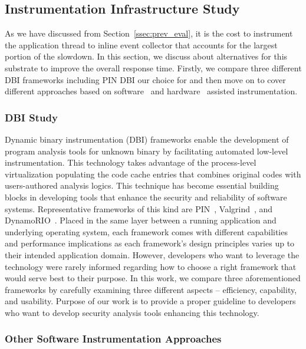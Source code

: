 \subsection{Instrumentation Infrastructure Study}
\label{ssec:inst_infra}

As we have discussed from Section~\ref{ssec:prev_eval}, it is the cost to
instrument the application thread to inline event collector that accounts for
the largest portion of the slowdown. In this section, we discuss about
alternatives for this substrate to improve the overall response time. Firstly,
we compare three different DBI frameworks including PIN DBI our choice for
\sreplica and then move on to cover different approaches based on
software~\cite{brewriting:usenix2003, DTrace} and
hardware~\cite{raksha:isca2007, lba:isca2008} assisted instrumentation. 

\subsubsection{DBI Study} 
\label{ssec:dbi_study}

Dynamic binary instrumentation (DBI) frameworks enable the development of
program analysis tools for unknown binary by facilitating automated low-level
instrumentation. This technology takes advantage of the process-level
virtualization populating the code cache entries that combines original codes
with users-authored analysis logics. This technique has become essential
building blocks in developing tools that enhance the security and reliability
of software systems.  Representative frameworks of this kind are
PIN~\cite{pin:pldi2005}, Valgrind~\cite{valgrind}, and
DynamoRIO~\cite{dynamorio}.
%
Placed in the same layer between a running application and underlying operating
system, each framework comes with different capabilities and performance
implications as each framework’s design principles varies up to their intended
application domain. However, developers who want to leverage the technology
were rarely informed regarding how to choose a right framework that would serve
best to their purpose.
%
In this work, we compare three aforementioned frameworks by carefully examining
three different aspects – efficiency, capability, and usability. Purpose of our
work is to provide a proper guideline to developers who want to develop
security analysis tools enhancing this technology.

\subsubsection{Other Software Instrumentation Approaches}
\label{ssec:sw_inst}

